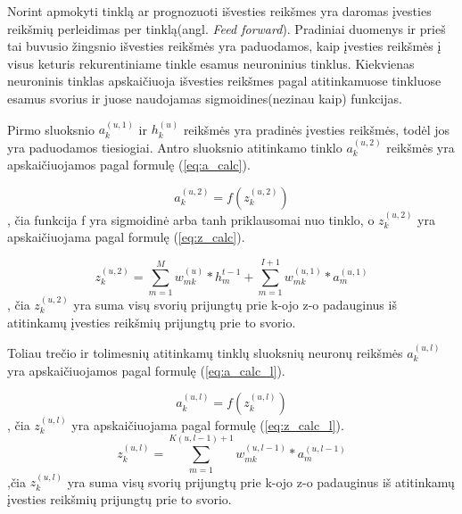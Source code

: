 Norint apmokyti tinklą ar prognozuoti išvesties reikšmes yra daromas įvesties reikšmių perleidimas per tinklą(angl. \textit{Feed forward}). Pradiniai duomenys ir prieš tai buvusio žingsnio išvesties reikšmės yra paduodamos, kaip įvesties reikšmės į visus keturis rekurentiniame tinkle esamus neuroninius tinklus. Kiekvienas neuroninis tinklas apskaičiuoja išvesties reikšmes pagal atitinkamuose tinkluose esamus svorius ir juose naudojamas sigmoidines(nezinau kaip) funkcijas.

Pirmo sluoksnio \begin{math}a_k^{(u,1)}\end{math} ir \begin{math}h_k^{(u)}\end{math} reikšmės yra pradinės įvesties reikšmės, todėl jos yra paduodamos tiesiogiai.
Antro sluoksnio atitinkamo tinklo \begin{math}a_k^{(u,2)}\end{math} reikšmės yra apskaičiuojamos pagal formulę (\ref{eq:a_calc}).

\begin{equation}\label{eq:a_calc}
  a_k^{(u,2)} = f(z_k^{(u,2)})
\end{equation}
, čia funkcija f yra sigmoidinė arba tanh priklausomai nuo tinklo, o \begin{math}z_k^{(u,2)}\end{math} yra apskaičiuojama pagal formulę (\ref{eq:z_calc}).

\begin{equation}\label{eq:z_calc}
  z_k^{(u,2)} = \sum_{m=1}^{M} w_{mk}^{(u)}*h_m^{t-1} + \sum_{m=1}^{I+1} w_{mk}^{(u,1)}*a_m^{(u,1)}
\end{equation}
, čia \begin{math}z_k^{(u,2)}\end{math} yra suma visų svorių prijungtų prie k-ojo z-o padauginus iš atitinkamų įvesties reikšmių prijungtų prie to svorio.

Toliau trečio ir tolimesnių atitinkamų tinklų sluoksnių neuronų reikšmės \begin{math}a_k^{(u,l)}\end{math} yra apskaičiuojamos pagal formulę (\ref{eq:a_calc_l}).

\begin{equation}\label{eq:a_calc_l}
  a_k^{(u,l)} = f(z_k^{(u,l)})
\end{equation}
, čia \begin{math}z_k^{(u,l)}\end{math} yra apskaičiuojama pagal formulę (\ref{eq:z_calc_l}).
\begin{equation}\label{eq:z_calc_l}
  z_k^{(u,l)} = \sum_{m=1}^{K(u,l-1)+1} w_{mk}^{(u,l-1)}*a_m^{(u,l-1)}
\end{equation}
,čia \begin{math}z_k^{(u,l)}\end{math} yra suma visų svorių prijungtų prie k-ojo z-o padauginus iš atitinkamų įvesties reikšmių prijungtų prie to svorio.


